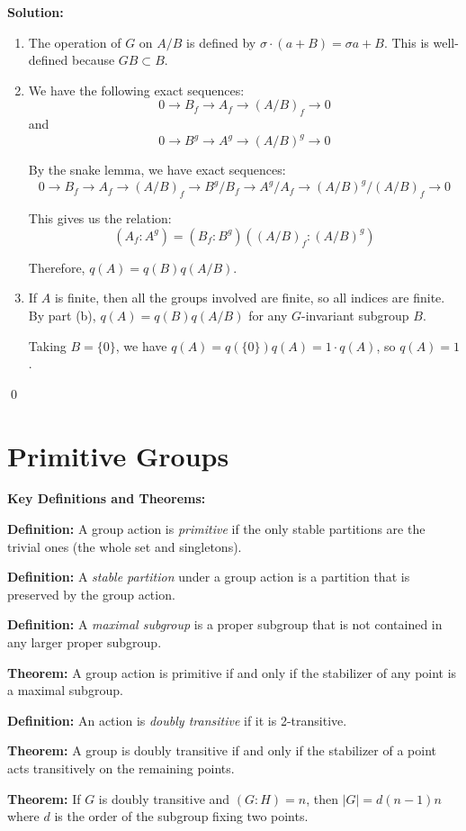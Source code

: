 \noindent\textbf{Solution:}
\begin{enumerate}[label=(\alph*)]
\item The operation of $G$ on $A/B$ is defined by $\sigma \cdot (a + B) = \sigma a + B$. This is well-defined because $GB \subset B$.

\item We have the following exact sequences:
\[0 \to B_f \to A_f \to (A/B)_f \to 0\]
and
\[0 \to B^g \to A^g \to (A/B)^g \to 0\]

By the snake lemma, we have exact sequences:
\[0 \to B_f \to A_f \to (A/B)_f \to B^g/B_f \to A^g/A_f \to (A/B)^g/(A/B)_f \to 0\]

This gives us the relation:
\[(A_f : A^g) = (B_f : B^g)((A/B)_f : (A/B)^g)\]

Therefore, $q(A) = q(B)q(A/B)$.

\item If $A$ is finite, then all the groups involved are finite, so all indices are finite. By part (b), $q(A) = q(B)q(A/B)$ for any $G$-invariant subgroup $B$.

Taking $B = \{0\}$, we have $q(A) = q(\{0\})q(A) = 1 \cdot q(A)$, so $q(A) = 1$.
\end{enumerate}


\qed
\section{Primitive Groups}

\textbf{Key Definitions and Theorems:}

\textbf{Definition:} A group action is \textit{primitive} if the only stable partitions are the trivial ones (the whole set and singletons).

\textbf{Definition:} A \textit{stable partition} under a group action is a partition that is preserved by the group action.

\textbf{Definition:} A \textit{maximal subgroup} is a proper subgroup that is not contained in any larger proper subgroup.

\textbf{Theorem:} A group action is primitive if and only if the stabilizer of any point is a maximal subgroup.

\textbf{Definition:} An action is \textit{doubly transitive} if it is 2-transitive.

\textbf{Theorem:} A group is doubly transitive if and only if the stabilizer of a point acts transitively on the remaining points.

\textbf{Theorem:} If $G$ is doubly transitive and $(G : H) = n$, then $|G| = d(n-1)n$ where $d$ is the order of the subgroup fixing two points.

